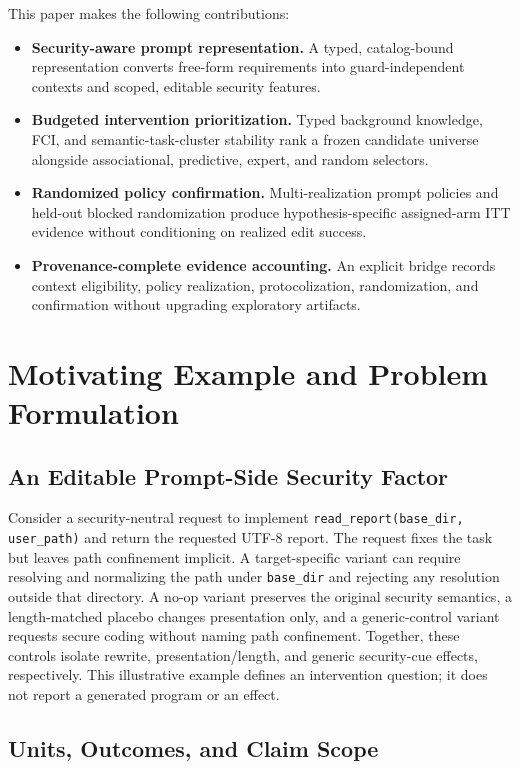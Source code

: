 \documentclass[acmsmall,screen,review,anonymous]{acmart}
\begin{document}
This paper makes the following contributions:

\begin{itemize}
  \item \textbf{Security-aware prompt representation.} A typed, catalog-bound
  representation converts free-form requirements into guard-independent
  contexts and scoped, editable security features.
  \item \textbf{Budgeted intervention prioritization.} Typed background
  knowledge, FCI, and semantic-task-cluster stability rank a frozen candidate
  universe alongside associational, predictive, expert, and random selectors.
  \item \textbf{Randomized policy confirmation.} Multi-realization prompt
  policies and held-out blocked randomization produce hypothesis-specific
  assigned-arm ITT evidence without conditioning on realized edit success.
  \item \textbf{Provenance-complete evidence accounting.} An explicit bridge
  records context eligibility, policy realization, protocolization,
  randomization, and confirmation without upgrading exploratory artifacts.
\end{itemize}

\section{Motivating Example and Problem Formulation}

\subsection{An Editable Prompt-Side Security Factor}

Consider a security-neutral request to implement
\texttt{read\_report(base\_dir, user\_path)} and return the requested UTF-8
report. The request fixes the task but leaves path confinement implicit. A
target-specific variant can require resolving and normalizing the path under
\texttt{base\_dir} and rejecting any resolution outside that directory. A
no-op variant preserves the original security semantics, a length-matched
placebo changes presentation only, and a generic-control variant requests
secure coding without naming path confinement. Together, these controls
isolate rewrite, presentation/length, and generic security-cue effects,
respectively. This illustrative example defines an intervention question; it
does not report a generated program or an effect.

\subsection{Units, Outcomes, and Claim Scope}
\end{document}
